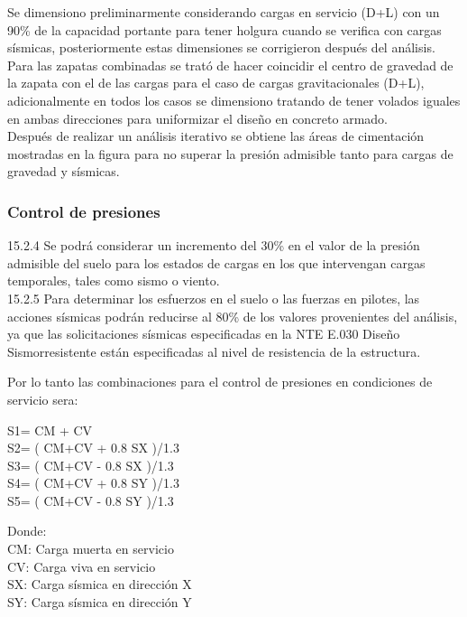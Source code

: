 \documentclass{article}%
\begin{document}
Se dimensiono preliminarmente considerando cargas en servicio (D+L) con un 90\% de la capacidad portante para tener holgura cuando se verifica con cargas sísmicas, posteriormente estas dimensiones se corrigieron después del análisis.\\
Para las zapatas combinadas se trató de hacer coincidir el centro de gravedad de la zapata con el de las cargas para el caso de cargas gravitacionales (D+L), adicionalmente en todos los casos se dimensiono tratando de tener volados iguales en ambas direcciones para uniformizar el diseño en concreto armado.\\
Después de realizar un análisis iterativo se obtiene las áreas de cimentación mostradas en la figura  para no superar la presión admisible tanto para cargas de gravedad y sísmicas. 
%
\subsubsection{Control de presiones}

15.2.4 Se podrá considerar un incremento del 30\% en el valor de la presión admisible del suelo para los estados de cargas en los que intervengan cargas temporales, tales como sismo o viento.\\
15.2.5 Para determinar los esfuerzos en el suelo o las fuerzas en pilotes, las acciones sísmicas podrán reducirse al 80\% de los valores provenientes del análisis, ya que las solicitaciones sísmicas especificadas en la NTE E.030 Diseño Sismorresistente están especificadas al nivel de resistencia de la estructura.

\newpage
\noindent Por lo tanto las combinaciones para el control de presiones en condiciones de servicio sera:
\begin{center}
    S1= CM + CV\\
    S2= ( CM+CV + 0.8 SX )/1.3\\
    S3= ( CM+CV - 0.8 SX )/1.3\\
    S4= ( CM+CV + 0.8 SY )/1.3\\
    S5= ( CM+CV - 0.8 SY )/1.3 
\end{center}
\noindent 
Donde:\\
CM: Carga muerta en servicio\\
CV: Carga viva en servicio\\
SX: Carga sísmica en dirección X\\
SY: Carga sísmica en dirección Y\\
\end{document}
